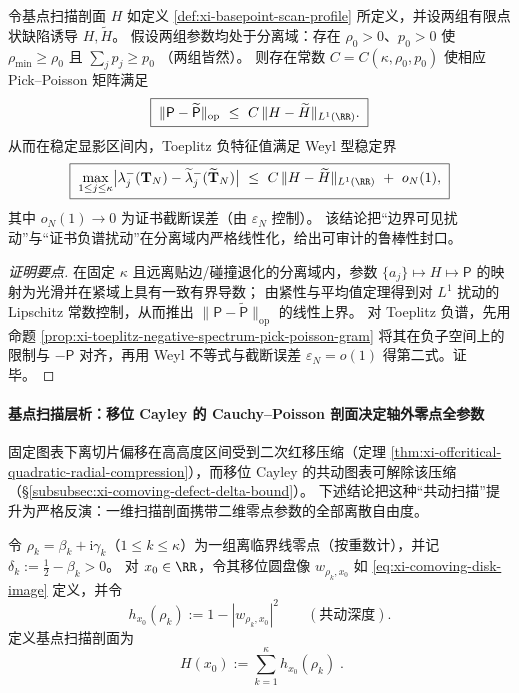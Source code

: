 \begin{proposition}\label{prop:xi-boundary-density-perturbation-spectral-stability}
令基点扫描剖面 \(H\) 如定义 \ref{def:xi-basepoint-scan-profile} 所定义，并设两组有限点状缺陷诱导 \(H,\widetilde H\)。
假设两组参数均处于分离域：存在 \(\rho_0>0\)、\(p_0>0\) 使
\(
\rho_{\min}\ge \rho_0
\)
且
\(
\sum_j p_j\ge p_0
\)
（两组皆然）。
则存在常数 \(C=C(\kappa,\rho_0,p_0)\) 使相应 Pick--Poisson 矩阵满足
\[
\boxed{\;
\|\mathsf P-\widetilde{\mathsf P}\|_{\mathrm{op}}
\ \le\ C\,\|H-\widetilde H\|_{L^1(\RR)}.\;}
\]
从而在稳定显影区间内，Toeplitz 负特征值满足 Weyl 型稳定界
\[
\boxed{\;
\max_{1\le j\le\kappa}\bigl|\lambda_j^{-}(\mathbf{T}_N)-\widetilde\lambda_j^{-}(\widetilde{\mathbf{T}}_N)\bigr|
\ \le\ C\,\|H-\widetilde H\|_{L^1(\RR)}\ +\ o_N(1),\;}
\]
其中 \(o_N(1)\to 0\) 为证书截断误差（由 \(\varepsilon_N\) 控制）。
该结论把“边界可见扰动”与“证书负谱扰动”在分离域内严格线性化，给出可审计的鲁棒性封口。
\end{proposition}
\begin{proof}[证明要点]
在固定 \(\kappa\) 且远离贴边/碰撞退化的分离域内，参数 \(\{a_j\}\mapsto H\mapsto \mathsf P\) 的映射为光滑并在紧域上具有一致有界导数；
由紧性与平均值定理得到对 \(L^1\) 扰动的 Lipschitz 常数控制，从而推出 \(\|\mathsf P-\widetilde{\mathsf P}\|_{\mathrm{op}}\) 的线性上界。
对 Toeplitz 负谱，先用命题 \ref{prop:xi-toeplitz-negative-spectrum-pick-poisson-gram} 将其在负子空间上的限制与 \(-\mathsf P\) 对齐，再用 Weyl 不等式与截断误差 \(\varepsilon_N=o(1)\) 得第二式。证毕。
\end{proof}



\paragraph{基点扫描层析：移位 Cayley 的 Cauchy--Poisson 剖面决定轴外零点全参数}
固定图表下离切片偏移在高高度区间受到二次红移压缩（定理 \ref{thm:xi-offcritical-quadratic-radial-compression}），而移位 Cayley 的共动图表可解除该压缩（\S\ref{subsubsec:xi-comoving-defect-delta-bound}）。
下述结论把这种“共动扫描”提升为严格反演：一维扫描剖面携带二维零点参数的全部离散自由度。

\begin{definition}[基点扫描剖面]\label{def:xi-basepoint-scan-profile}
令 \(\rho_k=\beta_k+\mathrm{i}\gamma_k\)（\(1\le k\le\kappa\)）为一组离临界线零点（按重数计），并记 \(\delta_k:=\tfrac12-\beta_k>0\)。
对 \(x_0\in\RR\)，令其移位圆盘像 \(w_{\rho_k,x_0}\) 如 \eqref{eq:xi-comoving-disk-image} 定义，并令
\[
h_{x_0}(\rho_k):=1-|w_{\rho_k,x_0}|^2
\qquad(\text{共动深度}).
\]
定义基点扫描剖面为
\[
\boxed{\;
H(x_0):=\sum_{k=1}^{\kappa}h_{x_0}(\rho_k)\; }.
\]
\end{definition}

